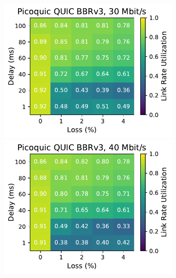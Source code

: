 \begin{figure}[ht]
\begin{subfigure}[b]{0.22\linewidth}
        \includegraphics[width=\linewidth,trim={0 0 2cm 0},clip]{splitting/figures/heatmaps/heatmap_picoquic_bbr3_30mbps.pdf}
        \includegraphics[width=\linewidth,trim={0 0 2cm 0},clip]{splitting/figures/heatmaps/heatmap_picoquic_bbr3_40mbps.pdf}

\end{subfigure}
\end{figure}
